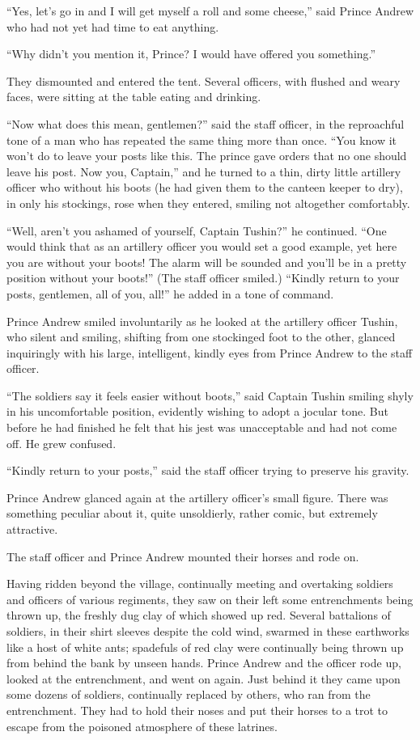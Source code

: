 ``Yes, let's go in and I will get myself a roll and some
cheese,'' said Prince Andrew who had not yet had time to eat
anything.

``Why didn't you mention it, Prince? I would have offered you
something.''

They dismounted and entered the tent. Several officers, with
flushed and weary faces, were sitting at the table eating and
drinking.

``Now what does this mean, gentlemen?'' said the staff officer,
in the reproachful tone of a man who has repeated the same thing
more than once. ``You know it won't do to leave your posts like
this. The prince gave orders that no one should leave his
post. Now you, Captain,'' and he turned to a thin, dirty little
artillery officer who without his boots (he had given them to the
canteen keeper to dry), in only his stockings, rose when they
entered, smiling not altogether comfortably.

``Well, aren't you ashamed of yourself, Captain Tushin?'' he
continued.  ``One would think that as an artillery officer you
would set a good example, yet here you are without your boots!
The alarm will be sounded and you'll be in a pretty position
without your boots!'' (The staff officer smiled.) ``Kindly return
to your posts, gentlemen, all of you, all!'' he added in a tone
of command.

Prince Andrew smiled involuntarily as he looked at the artillery
officer Tushin, who silent and smiling, shifting from one
stockinged foot to the other, glanced inquiringly with his large,
intelligent, kindly eyes from Prince Andrew to the staff officer.

``The soldiers say it feels easier without boots,'' said Captain
Tushin smiling shyly in his uncomfortable position, evidently
wishing to adopt a jocular tone. But before he had finished he
felt that his jest was unacceptable and had not come off. He grew
confused.

``Kindly return to your posts,'' said the staff officer trying to
preserve his gravity.

Prince Andrew glanced again at the artillery officer's small
figure.  There was something peculiar about it, quite
unsoldierly, rather comic, but extremely attractive.

The staff officer and Prince Andrew mounted their horses and rode
on.

Having ridden beyond the village, continually meeting and
overtaking soldiers and officers of various regiments, they saw
on their left some entrenchments being thrown up, the freshly dug
clay of which showed up red. Several battalions of soldiers, in
their shirt sleeves despite the cold wind, swarmed in these
earthworks like a host of white ants; spadefuls of red clay were
continually being thrown up from behind the bank by unseen
hands. Prince Andrew and the officer rode up, looked at the
entrenchment, and went on again. Just behind it they came upon
some dozens of soldiers, continually replaced by others, who ran
from the entrenchment. They had to hold their noses and put their
horses to a trot to escape from the poisoned atmosphere of these
latrines.

